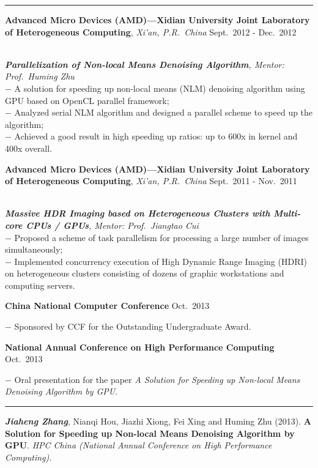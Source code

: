 \documentclass[a4paper,10pt]{article}
\newcommand{\shadedsection}[1]{
    \setlength{\fboxsep}{0pt}
    \colorbox{shadecolor}{%
        \begin{minipage}{\linewidth}%
            \vspace{0.2em}%
            #1%
        \end{minipage}%
    }
}
\newenvironment{rSection}[1]{ %
  \medskip
  \hspace{-1.5em}{\color{Blue}\MakeUppercase{\large \bf {#1}}} %
  \vspace{-0.2em}
  \medskip
  \hrule %
  \begin{list}{}{ %
    \setlength{\leftmargin}{1.5em} %
  }
\setlength{\itemsep}{1pt}
  \item[]
}{
  \end{list}
}
\newcommand{\detail}[1]{{$-$ {#1}}}
\newcommand{\period}[3]{\normalsize {#1} \hfill {#2} - {#3}}
\newcommand{\conference}[2]{\shadedsection{{\bf #1} \hfill {#2}}}
\begin{document}
\begin{rSection}{Academic Experience}
  \vspace{-1.5em}
  \item
    \shadedsection{\period{{\bf Advanced Micro Devices (AMD)---Xidian University Joint Laboratory of Heterogeneous Computing}, {\em Xi'an, P.R.~China}}{Sept.~2012}{Dec.~2012}}\\
    {\em {\bf Parallelization of Non-local Means Denoising Algorithm}, Mentor: Prof.~Huming Zhu}\\
    \detail{A solution for speeding up non-local means (NLM) denoising algorithm using GPU based on OpenCL parallel framework;}\\
    \detail{Analyzed serial NLM algorithm and designed a parallel scheme to speed up the algorithm;}\\
    \detail{Achieved a good result in high speeding up ratios: up to 600x in kernel and 400x overall.}
  \item
    \shadedsection{\period{{\bf Advanced Micro Devices (AMD)---Xidian University Joint Laboratory of Heterogeneous Computing}, {\em Xi'an, P.R.~China}}{Sept.~2011}{Nov.~2011}}\\
    {\em {\bf Massive HDR Imaging based on Heterogeneous Clusters with Multi-core CPUs / GPUs}, Mentor: Prof.~Jiangtao Cui}\\
    \detail{Proposed a scheme of task parallelism for processing a large number of images simultaneously;}\\
    \detail{Implemented concurrency execution of High Dynamic Range Imaging (HDRI) on heterogeneous clusters consisting of dozens of graphic workstations and computing servers.}\\
    \conference{China National Computer Conference}{Oct.~2013}
    \detail{Sponsored by CCF for the Outstanding Undergraduate Award.}\\
    \conference{National Annual Conference on High Performance Computing}{Oct.~2013}
    \detail{Oral presentation for the paper {\em A Solution for Speeding up Non-local Means Denoising Algorithm by GPU}.}
\end{rSection}

\vspace{-0.5em}

\begin{rSection}{Publication}
  \vspace{-1.5em}
    \item
      {\bf \em Jiaheng Zhang}, Nianqi Hou, Jiazhi Xiong, Fei Xing and Huming Zhu (2013). {\bf A Solution for Speeding up Non-local Means Denoising Algorithm by GPU}. {\em HPC China (National Annual Conference on High Performance Computing).}
\end{rSection}
\end{document}
